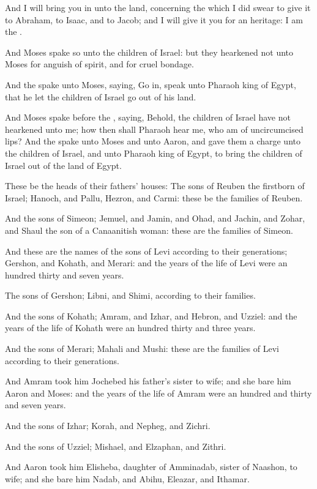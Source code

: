\verse And I will bring you in unto the land, concerning the which I did
swear to give it to Abraham, to Isaac, and to Jacob; and I will give
it you for an heritage: I am the \LORD.

\verse And Moses spake so unto the children of Israel: but they hearkened
not unto Moses for anguish of spirit, and for cruel bondage.

\verse And the \LORD spake unto Moses, saying, \verse Go in, speak unto
Pharaoh king of Egypt, that he let the children of Israel go out of
his land.

\verse And Moses spake before the \LORD, saying, Behold, the children of
Israel have not hearkened unto me; how then shall Pharaoh hear me, who
am of uncircumcised lips?  \verse And the \LORD spake unto Moses and unto
Aaron, and gave them a charge unto the children of Israel, and unto
Pharaoh king of Egypt, to bring the children of Israel out of the land
of Egypt.

\verse These be the heads of their fathers' houses: The sons of Reuben
the firstborn of Israel; Hanoch, and Pallu, Hezron, and Carmi: these
be the families of Reuben.

\verse And the sons of Simeon; Jemuel, and Jamin, and Ohad, and Jachin,
and Zohar, and Shaul the son of a Canaanitish woman: these are the
families of Simeon.

\verse And these are the names of the sons of Levi according to their
generations; Gershon, and Kohath, and Merari: and the years of the
life of Levi were an hundred thirty and seven years.

\verse The sons of Gershon; Libni, and Shimi, according to their
families.

\verse And the sons of Kohath; Amram, and Izhar, and Hebron, and Uzziel:
and the years of the life of Kohath were an hundred thirty and three
years.

\verse And the sons of Merari; Mahali and Mushi: these are the families
of Levi according to their generations.

\verse And Amram took him Jochebed his father's sister to wife; and she
bare him Aaron and Moses: and the years of the life of Amram were an
hundred and thirty and seven years.

\verse And the sons of Izhar; Korah, and Nepheg, and Zichri.

\verse And the sons of Uzziel; Mishael, and Elzaphan, and Zithri.

\verse And Aaron took him Elisheba, daughter of Amminadab, sister of
Naashon, to wife; and she bare him Nadab, and Abihu, Eleazar, and
Ithamar.

